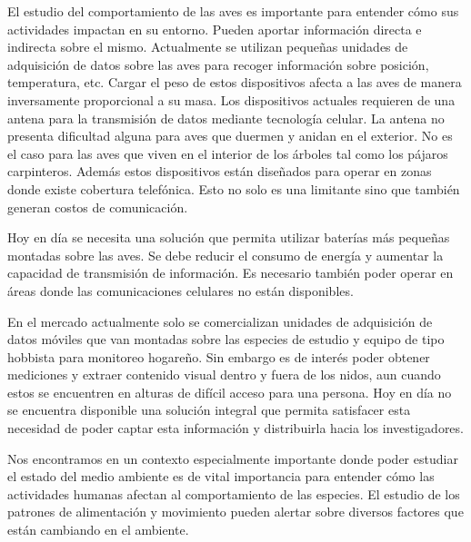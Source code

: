 %

%


El estudio del comportamiento de las aves es importante para entender cómo sus actividades impactan en su entorno. Pueden aportar información directa e indirecta sobre el mismo. Actualmente se utilizan pequeñas unidades de adquisición de datos sobre las aves para recoger información sobre posición, temperatura, etc. 
Cargar el peso de estos dispositivos afecta a las aves de manera inversamente proporcional a su masa. Los dispositivos actuales requieren de una antena para la transmisión de datos mediante tecnología celular. La antena no presenta dificultad alguna para aves que duermen y anidan en el exterior. No es el caso para las aves que viven en el interior de los árboles tal como los pájaros carpinteros. Además estos dispositivos están diseñados para operar en zonas donde existe cobertura telefónica. Esto no solo es una limitante sino que también generan costos de comunicación.

Hoy en día se necesita una solución que permita utilizar baterías más pequeñas montadas sobre las aves. Se debe reducir el consumo de energía y aumentar la capacidad de transmisión de información. Es necesario también poder operar en áreas donde las comunicaciones celulares no están disponibles.

En el mercado actualmente solo se comercializan unidades de adquisición de datos móviles que van montadas sobre las especies de estudio y equipo de tipo hobbista para monitoreo hogareño. Sin embargo es de interés poder obtener mediciones y extraer contenido visual dentro y fuera de los nidos, aun cuando estos se encuentren en alturas de difícil acceso para una persona. Hoy en día no se encuentra disponible una solución integral que permita satisfacer esta necesidad de poder captar esta información y distribuirla hacia los investigadores.


Nos encontramos en un contexto especialmente importante donde poder estudiar el estado del medio ambiente es de vital importancia para entender cómo las actividades humanas afectan al comportamiento de las especies. El estudio de los patrones de alimentación y movimiento pueden alertar sobre diversos factores que están cambiando en el ambiente.  

%